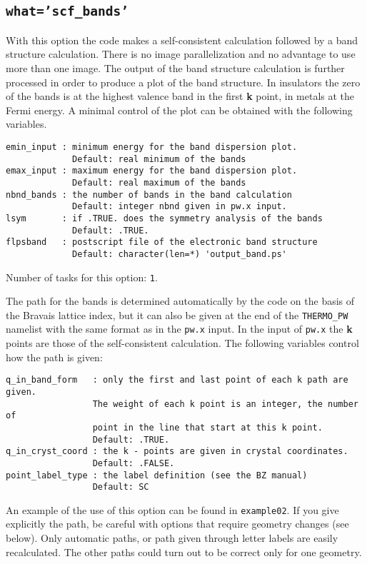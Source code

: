 \documentclass[12pt,a4paper]{article}
\begin{document}
\subsection{\texttt{what='scf\_bands'}}
With this option the code makes a self-consistent calculation followed 
by a band structure calculation. There is no image parallelization and no
advantage to use more than one image. The output of the band structure 
calculation is further processed in order to produce a plot of the band 
structure.
In insulators the zero of the bands is at the highest valence band in the
first {\bf k} point, in metals at the Fermi energy. 
A minimal control of the plot can be obtained with the following variables.

\begin{verbatim}
emin_input : minimum energy for the band dispersion plot.
             Default: real minimum of the bands
emax_input : maximum energy for the band dispersion plot.
             Default: real maximum of the bands
nbnd_bands : the number of bands in the band calculation
             Default: integer nbnd given in pw.x input.
lsym       : if .TRUE. does the symmetry analysis of the bands
             Default: .TRUE.
flpsband   : postscript file of the electronic band structure
             Default: character(len=*) 'output_band.ps'
\end{verbatim}
Number of tasks for this option: \texttt{1}.

The path for the bands is determined automatically by the code on the basis
of the Bravais lattice index, but it can also be given at the end of
the \texttt{THERMO\_PW} namelist with the same format as in the \texttt{pw.x}
input. In the input of \texttt{pw.x} the {\bf k} points are those of the
self-consistent calculation. The following variables control how the path
is given:
\begin{verbatim}
q_in_band_form   : only the first and last point of each k path are given.
                 The weight of each k point is an integer, the number of 
                 point in the line that start at this k point.
                 Default: .TRUE.
q_in_cryst_coord : the k - points are given in crystal coordinates.
                 Default: .FALSE.
point_label_type : the label definition (see the BZ manual)
                 Default: SC
\end{verbatim}
An example of the use of this option can be found in \texttt{example02}.
If you give explicitly the path, be careful with options that require
geometry changes (see below). Only automatic paths, or path given through 
letter labels are easily recalculated. The other paths could turn out 
to be correct only for one geometry.
\end{document}
